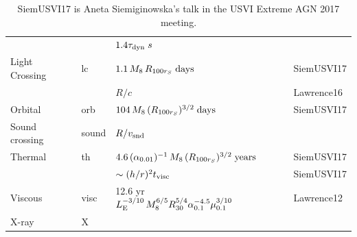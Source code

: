 \documentclass[11pt]{article}
\begin{document}
\begin{table}
\begin{center}
\begin{tabular}{l l l l l l}
                                  &            & $1.4 \tau_{\rm dyn} \; s $                                 & & & \\
      Light Crossing     & lc           &   $1.1 \,  M_{8} \, R_{100 r_{S}}  \; {\rm days}$   &   & & SiemUSVI17\\ 
                                  &               &  $ R / c$                                                            &   & & Lawrence16 \\ 
      Orbital                 &  orb    &     $104 \, M_{8} \,  (R_{100r_{S}})^{3/2} \;  {\rm days}$ & & & SiemUSVI17\\ 
      Sound crossing    &  sound  &     $ R / v_{\rm snd} $ & & & \\     
       Thermal               &   th     &    $4.6 \, (\alpha_{0.01})^{-1} \, M_{8}\, (R_{100r_{S}} )^{3/2}  \; {\rm years}$  & & & SiemUSVI17\\ 
                                   &           &   $\sim (h/r)^{2} t_{\rm visc}$                        & & & SiemUSVI17\\ 
      Viscous                 & visc  & 12.6 yr $L_{\rm E}^{-3/10} \, M_8^{6/5} R_{30}^{5/4} \alpha_{0.1}^{-4.5} \mu_{0.1}^{3/10}$  & & & Lawrence12 \\
      X-ray                    & X             &    & & & \\
         \hline
         \hline 
       \end{tabular}
      \caption{SiemUSVI17 is Aneta Siemiginowska's talk in the USVI Extreme AGN 2017 meeting.}
      \label{SiemUSVI17}
    \end{center}
\end{table}
\end{document}
